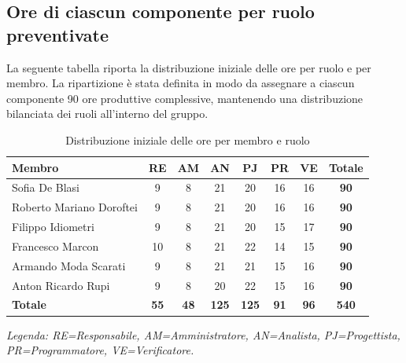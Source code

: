 \subsection{Ore di ciascun componente per ruolo preventivate}

La seguente tabella riporta la distribuzione iniziale delle ore per ruolo e per
membro. La ripartizione è stata definita in modo da assegnare a ciascun componente
90 ore produttive complessive, mantenendo una distribuzione bilanciata dei ruoli
all'interno del gruppo.

\begin{table}[H]
	\centering
	\renewcommand{\arraystretch}{1.3}
	\small
	\begin{tabular}{|l|c|c|c|c|c|c|c|}
		\hline
		\textbf{Membro} & \textbf{RE} & \textbf{AM} & \textbf{AN} & \textbf{PJ} & \textbf{PR} & \textbf{VE} & \textbf{Totale} \\
		\hline
		Sofia De Blasi & 9 & 8 & 21 & 20 & 16 & 16 & \textbf{90} \\
		Roberto Mariano Doroftei & 9 & 8 & 21 & 20 & 16 & 16 & \textbf{90} \\
		Filippo Idiometri & 9 & 8 & 21 & 20 & 15 & 17 & \textbf{90} \\
		Francesco Marcon & 10 & 8 & 21 & 22 & 14 & 15 & \textbf{90} \\
		Armando Moda Scarati & 9 & 8 & 21 & 21 & 15 & 16 & \textbf{90} \\
		Anton Ricardo Rupi & 9 & 8 & 20 & 22 & 15 & 16 & \textbf{90} \\
		\hline
		\textbf{Totale} & \textbf{55} & \textbf{48} & \textbf{125} & \textbf{125} & \textbf{91} & \textbf{96} & \textbf{540} \\
		\hline
	\end{tabular}
	\caption{Distribuzione iniziale delle ore per membro e ruolo}

	\begin{minipage}{\textwidth}
		\smallskip
		\footnotesize\textit{Legenda: RE=Responsabile, AM=Amministratore,
		AN=Analista, PJ=Progettista, PR=Programmatore, VE=Verificatore.}
    \end{minipage}
\end{table}